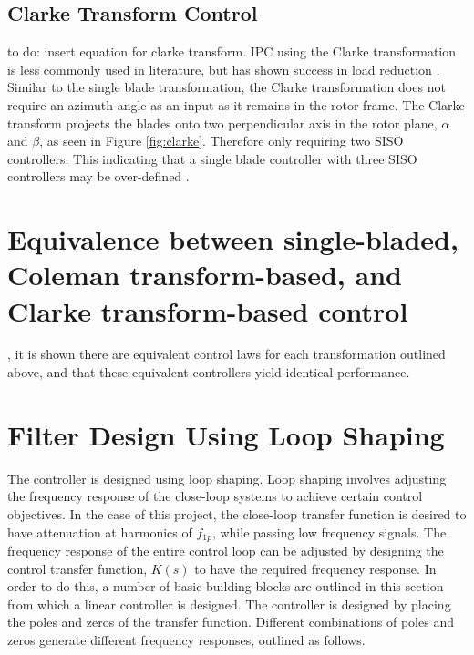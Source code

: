 \subsection{Clarke Transform Control}
to do: insert equation for clarke transform.
IPC using the Clarke transformation is less commonly used in literature, but has shown success in load reduction \cite{zhang2013proportional}. Similar to the single blade transformation, the Clarke transformation does not require an azimuth angle as an input as it remains in the rotor frame. The Clarke transform projects the blades onto two perpendicular axis in the rotor plane, $\alpha$ and $\beta$, as seen in Figure \ref{fig:clarke}. Therefore only requiring two SISO controllers. This indicating that a single blade controller with three SISO controllers may be over-defined \citep{19_Lio}.

\section{Equivalence between single-bladed, Coleman transform-based, and Clarke transform-based control}
\citet{20_lio2017fundamental}, it is shown there are equivalent control laws for each transformation outlined above, and that these equivalent controllers yield identical performance. 



\section{Filter Design Using Loop Shaping}
The controller is designed using loop shaping. Loop shaping involves adjusting the frequency response of the close-loop systems to achieve certain control objectives. In the case of this project, the close-loop transfer function is desired to have attenuation at harmonics of $f_{1p}$, while passing low frequency signals. The frequency response of the entire control loop can be adjusted by designing the control transfer function, $K(s)$ to have the required frequency response. In order to do this, a number of basic building blocks are outlined in this section from which a linear controller is designed. The controller is designed by placing the poles and zeros of the transfer function. Different combinations of poles and zeros generate different frequency responses, outlined as follows. 

